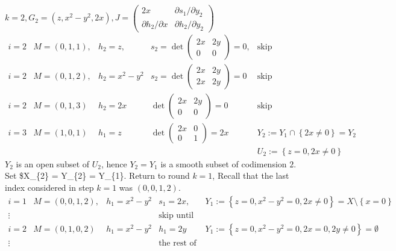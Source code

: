 \documentclass[
]{book}
\theoremstyle{definition}
\theoremstyle{definition}
\theoremstyle{definition}
\theoremstyle{definition}
\theoremstyle{remark}
\begin{document}
\(k=2,G_{2}=\left(z,x^{2}-y^{2},2x\right),J=\begin{pmatrix}2x & \partial s_{1}/\partial y_{2}\\ \partial h_{2}/\partial x & \partial h_{2}/\partial y_{2} \end{pmatrix}\)
\begin{equation}
\begin{matrix}
i = 2 & M=(0,1,1), & h_{2}=z, & s_{2}=\det\begin{pmatrix}2x & 2y\\
0 & 0
\end{pmatrix}=0, & \text{skip}\\
i = 2 & M=(0,1,2), & h_{2}=x^{2}-y^{2} & s_{2}=\det\begin{pmatrix}2x & 2y\\
2x & 2y
\end{pmatrix}=0 & \text{skip}\\
i = 2 & M=(0,1,3) & h_{2}=2x & \det\begin{pmatrix}2x & 2y\\
0 & 0
\end{pmatrix}=0 & \text{skip}\\
i = 3 & M=(1,0,1) & h_{1}=z & \det\begin{pmatrix}2x & 0\\
0 & 1
\end{pmatrix}=2x & Y_{2}:=Y_{1}\cap\left\{ 2x\ne0\right\} =Y_{2}\\
&  &  &  & U_{2}:=\left\{ z=0,2x\ne0\right\} 
\end{matrix}
\end{equation}
\(Y_{2}\) is an open subset of \(U_{2}\), hence \(Y_{2}=Y_{1}\) is a smooth subset of codimension \(2\). Set \$X\_\{2\} = Y\_\{2\} = Y\_\{1\}. Return to round \(k=1\), Recall that the last index considered in step \(k=1\) was \((0,0,1,2)\).
\begin{equation}
\begin{matrix}
i = 1 & M=(0,0,1,2), & h_{1}=x^{2}-y^{2} & s_{1}=2x, & Y_{1}:=\left\{ z=0,x^{2}-y^{2}=0,2x\ne0\right\} =X\setminus\left\{ x=0\right\} \\
\vdots &  &  & \text{skip until next nenzero partial derivative}\\
i = 2 & M=(0,1,0,2) & h_{1}=x^{2}-y^{2} & h_{1}=2y & Y_{1}:=\left\{ z=0,x^{2}-y^{2}=0,2x=0,2y\ne0\right\} =\emptyset\\
\vdots &  &  & \text{the rest of the partial derivatives do not exist}
\end{matrix}
\end{equation}
\end{document}
